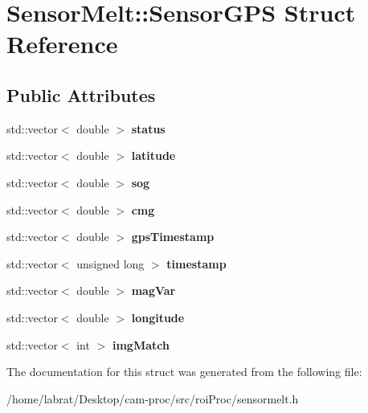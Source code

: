\hypertarget{structSensorMelt_1_1SensorGPS}{}\section{Sensor\+Melt\+:\+:Sensor\+G\+PS Struct Reference}
\label{structSensorMelt_1_1SensorGPS}
\subsection*{Public Attributes}
\begin{DoxyCompactItemize}
\item 
std\+::vector$<$ double $>$ {\bfseries status}\hypertarget{structSensorMelt_1_1SensorGPS_a92cf7714b2544cb1718a3ff7c68511e2}{}\label{structSensorMelt_1_1SensorGPS_a92cf7714b2544cb1718a3ff7c68511e2}

\item 
std\+::vector$<$ double $>$ {\bfseries latitude}\hypertarget{structSensorMelt_1_1SensorGPS_ab594c3e15aba1b8b0756da917e678973}{}\label{structSensorMelt_1_1SensorGPS_ab594c3e15aba1b8b0756da917e678973}

\item 
std\+::vector$<$ double $>$ {\bfseries sog}\hypertarget{structSensorMelt_1_1SensorGPS_a9ef6e860581eb1c7586fcf3a5df11fc0}{}\label{structSensorMelt_1_1SensorGPS_a9ef6e860581eb1c7586fcf3a5df11fc0}

\item 
std\+::vector$<$ double $>$ {\bfseries cmg}\hypertarget{structSensorMelt_1_1SensorGPS_ac8a9e9dd5477cee442a5d0088f4c232d}{}\label{structSensorMelt_1_1SensorGPS_ac8a9e9dd5477cee442a5d0088f4c232d}

\item 
std\+::vector$<$ double $>$ {\bfseries gps\+Timestamp}\hypertarget{structSensorMelt_1_1SensorGPS_a7e73941d1566790d742530552a55e6d9}{}\label{structSensorMelt_1_1SensorGPS_a7e73941d1566790d742530552a55e6d9}

\item 
std\+::vector$<$ unsigned long $>$ {\bfseries timestamp}\hypertarget{structSensorMelt_1_1SensorGPS_a3790f95b5f281302240466d101eeded2}{}\label{structSensorMelt_1_1SensorGPS_a3790f95b5f281302240466d101eeded2}

\item 
std\+::vector$<$ double $>$ {\bfseries mag\+Var}\hypertarget{structSensorMelt_1_1SensorGPS_a7d03786271670cac0831c6d86d8224dd}{}\label{structSensorMelt_1_1SensorGPS_a7d03786271670cac0831c6d86d8224dd}

\item 
std\+::vector$<$ double $>$ {\bfseries longitude}\hypertarget{structSensorMelt_1_1SensorGPS_ae05a2a3430c66dbf8d5ebec6dc0088da}{}\label{structSensorMelt_1_1SensorGPS_ae05a2a3430c66dbf8d5ebec6dc0088da}

\item 
std\+::vector$<$ int $>$ {\bfseries img\+Match}\hypertarget{structSensorMelt_1_1SensorGPS_afa70283843e17bb1e3272f53b30aea51}{}\label{structSensorMelt_1_1SensorGPS_afa70283843e17bb1e3272f53b30aea51}

\end{DoxyCompactItemize}


The documentation for this struct was generated from the following file\+:\begin{DoxyCompactItemize}
\item 
/home/labrat/\+Desktop/cam-\/proc/src/roi\+Proc/sensormelt.\+h\end{DoxyCompactItemize}
